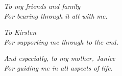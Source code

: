 \documentclass[\main/thesis.tex]{subfiles}
\begin{document}
\begin{dedication}
	\vspace*{1in}
	\begin{center}
    \emph{To my friends and family} \\
    \emph{For bearing through it all with me.}
	\end{center}
	\vspace*{.5in}
	\begin{center}
    \emph{To Kirsten} \\
    \emph{For supporting me through to the end.}
	\end{center}
	\vspace*{.5in}
	\begin{center}
    \emph{And especially, to my mother, Janice} \\
    \emph{For guiding me in all aspects of life.}
	\end{center}
\end{dedication}
\end{document}
